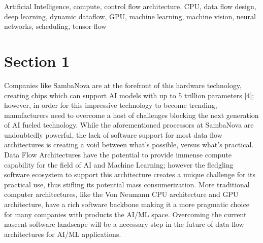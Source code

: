 \documentclass[11pt]{IEEEtran}
\begin{document}

\onecolumn
\singlespacing

\doublespacing


\clearpage
{}

\renewcommand\IEEEkeywordsname{Keyword Index}
\begin{IEEEkeywords}
Artificial Intelligence, compute, control flow architecture,  CPU, data flow design, deep learning, dynamic dataflow, GPU, machine learning, machine vision, neural networks, scheduling, tensor flow 
\end{IEEEkeywords}

\clearpage
\section{Section 1}
Companies like SambaNova are at the forefront of this hardware technology, creating chips which can support AI models with up to 5 trillion parameters [4]; however, in order for this impressive technology to become trending, manufacturers need to overcome a host of challenges blocking the next generation of AI fueled technology.  While the aforementioned processors at SambaNova are undoubtedly powerful, the lack of software support for most data flow architectures is creating a void between what's possible, versus what's practical.  Data Flow Architectures have the potential to provide immense compute capability for the field of AI and Machine Learning; however the fledgling software ecosystem to support this architecture creates a unique challenge for its practical use, thus stifling its potential mass consumerization.  More traditional computer architectures, like the Von Neumann CPU architecture and GPU architecture, have a rich software backbone making it a more pragmatic choice for many companies with products the AI/ML space.  Overcoming the current nascent software landscape will be a necessary step in the future of data flow architectures for AI/ML applications. 
\end{document}
